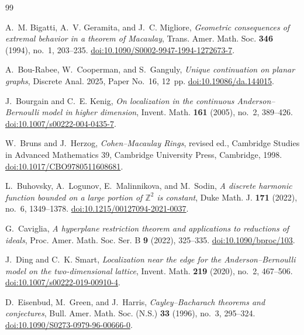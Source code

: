 \documentclass[11pt,reqno]{amsart}
\theoremstyle{definition}
\theoremstyle{plain}
\numberwithin{equation}{section}
\begin{document}
\begin{thebibliography}{99}

A.~M. Bigatti, A.~V. Geramita, and J.~C. Migliore,
\emph{Geometric consequences of extremal behavior in a theorem of Macaulay},
Trans. Amer. Math. Soc. \textbf{346} (1994), no.~1, 203--235.
\href{https://doi.org/10.1090/S0002-9947-1994-1272673-7}
{doi:10.1090/S0002-9947-1994-1272673-7}.

A.~Bou-Rabee, W.~Cooperman, and S.~Ganguly,
\emph{Unique continuation on planar graphs},
Discrete Anal. 2025, Paper No.~16, 12~pp.
\href{https://doi.org/10.19086/da.144015}
{doi:10.19086/da.144015}.

J.~Bourgain and C.~E. Kenig,
\emph{On localization in the continuous Anderson--Bernoulli model in higher
dimension},
Invent. Math. \textbf{161} (2005), no.~2, 389--426.
\href{https://doi.org/10.1007/s00222-004-0435-7}
{doi:10.1007/s00222-004-0435-7}.

W.~Bruns and J.~Herzog,
\emph{Cohen--Macaulay Rings}, revised ed.,
Cambridge Studies in Advanced Mathematics 39,
Cambridge University Press, Cambridge, 1998.
\href{https://doi.org/10.1017/CBO9780511608681}
{doi:10.1017/CBO9780511608681}.

L.~Buhovsky, A.~Logunov, E.~Malinnikova, and M.~Sodin,
\emph{A discrete harmonic function bounded on a large portion of
$\mathbb Z^2$ is constant},
Duke Math. J. \textbf{171} (2022), no.~6, 1349--1378.
\href{https://doi.org/10.1215/00127094-2021-0037}
{doi:10.1215/00127094-2021-0037}.

G.~Caviglia,
\emph{A hyperplane restriction theorem and applications to reductions of
ideals},
Proc. Amer. Math. Soc. Ser. B \textbf{9} (2022), 325--335.
\href{https://doi.org/10.1090/bproc/103}
{doi:10.1090/bproc/103}.

J.~Ding and C.~K. Smart,
\emph{Localization near the edge for the Anderson--Bernoulli model on the
two-dimensional lattice},
Invent. Math. \textbf{219} (2020), no.~2, 467--506.
\href{https://doi.org/10.1007/s00222-019-00910-4}
{doi:10.1007/s00222-019-00910-4}.

D.~Eisenbud, M.~Green, and J.~Harris,
\emph{Cayley--Bacharach theorems and conjectures},
Bull. Amer. Math. Soc. (N.S.) \textbf{33} (1996), no.~3, 295--324.
\href{https://doi.org/10.1090/S0273-0979-96-00666-0}
{doi:10.1090/S0273-0979-96-00666-0}.


\end{thebibliography}
\end{document}
